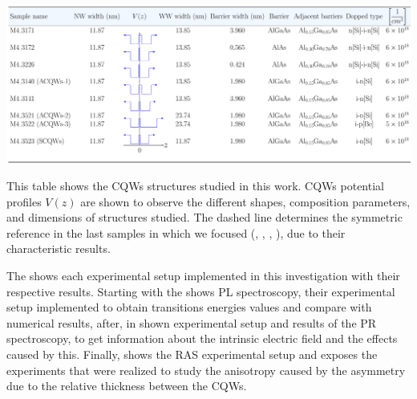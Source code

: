 \begin{table}[H]
	\centering
	\includegraphics[width=\textwidth]{../tables/table-1-samples/build/table-1-samples.pdf}
	\caption[Table of samples description]{This table shows the CQWs structures studied in this work.  CQWs potential profiles $V(z)$ are shown to observe the different shapes, composition parameters, and dimensions of structures studied. The dashed line determines the symmetric reference in the last samples in which we focused (\tucu, \tcvu, \tcvd, \tcvt), due to their characteristic results. }
	\label{tab:chapter3:Samples description} 
\end{table}




The   shows each experimental setup implemented in this investigation with their respective results. Starting with the   shows PL spectroscopy, their experimental setup implemented to obtain transitions energies values and compare with numerical results, after,  in  shown experimental setup and results of the PR spectroscopy, to get information about the intrinsic electric field and the effects caused by this. Finally,   shows the RAS experimental setup and exposes the experiments that were realized to study the anisotropy caused by the asymmetry due to the relative thickness between the CQWs.


\newpage
